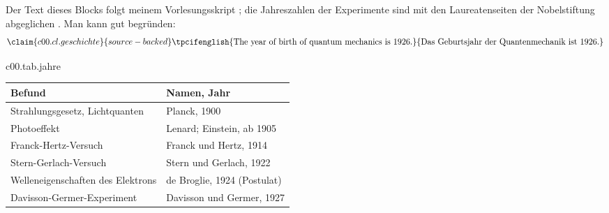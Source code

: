 
\begin{vertiefung}[id=c00.v2,
    titel={Namen und Jahreszahlen},
    wozu={Der Kern nennt die Befunde ohne Geschichte. Hier stehen die Jahreszahlen und
      Namen, für alle, die die Geschichte erzählen wollen.},
    voraussetzung={Abschnitt~\ref{c00.s4}. Der Rest des Kurses braucht diesen Block
      nicht.},
    zurueck={Die mathematische Form der Quantenmechanik und ihre statistische Deutung
      entstanden in den Jahren 1925 bis 1927.}]
  Der Text dieses Blocks folgt meinem Vorlesungsskript ; die Jahreszahlen der Experimente sind mit den Laureatenseiten der
  Nobelstiftung abgeglichen . Man kann gut
  begründen:
  \begin{equation}\label{c00.eq.geburtsjahr}\claim{c00.cl.geschichte}{source-backed}
    \text{\tpcifenglish{The year of birth of quantum mechanics is 1926.}{Das Geburtsjahr der Quantenmechanik ist 1926.}}
  \end{equation}

  \begin{tpctable}{c00.tab.jahre}
    \caption{Jahreszahlen und Namen zu den Befunden des Abschnitts~\ref{c00.s4}. Die Jahre
      folgen den Laureatenseiten der Nobelstiftung und, für Davisson und Germer, dem
      Erscheinungsjahr ihrer Arbeit in der Physical Review.}
    \begin{tabular}{ll}
      \toprule
      Befund & Namen, Jahr \\
      \midrule
      Strahlungsgesetz, Lichtquanten & Planck, 1900 \\
      Photoeffekt & Lenard; Einstein, ab 1905 \\
      Franck-Hertz-Versuch & Franck und Hertz, 1914 \\
      Stern-Gerlach-Versuch & Stern und Gerlach, 1922 \\
      Welleneigenschaften des Elektrons & de Broglie, 1924 (Postulat) \\
      Davisson-Germer-Experiment & Davisson und Germer, 1927 \\
      \bottomrule
    \end{tabular}
  \end{tpctable}


\end{vertiefung}
